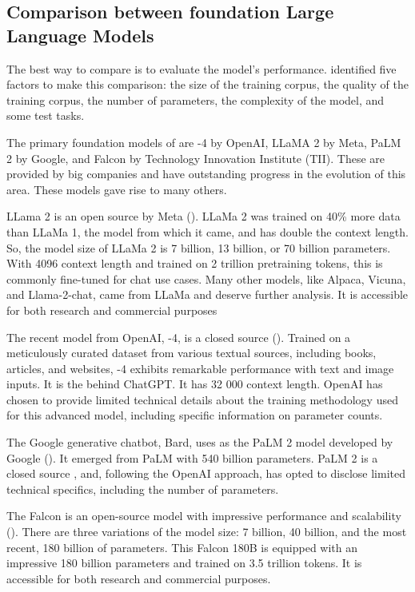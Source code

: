 \subsection{Comparison between foundation Large Language Models}

The best way to compare {\llm} is to evaluate the model's performance. \citet{hadi_LLM_2023} identified five factors to make this comparison: the size of the training corpus, the quality of the training corpus, the number of parameters, the complexity of the model, and some test tasks.

The primary foundation models of {\llm} are {\gpt}-4 by OpenAI, LLaMA 2 by Meta, PaLM 2 by Google, and Falcon by Technology Innovation Institute (TII). These {\llm} are provided by big companies and have outstanding progress in the evolution of this area. These models gave rise to many others.

LLama 2 is an open source {\llm} by Meta (\citet{touvron_llama_2023}). LLaMa 2 was trained on 40\% more data than LLaMa 1, the model from which it came, and has double the context length. So, the model size of LLaMa 2 is 7 billion, 13 billion, or 70 billion parameters. With 4096 context length and trained on 2 trillion pretraining tokens, this {\llm} is commonly fine-tuned for chat use cases. Many other models, like Alpaca, Vicuna, and Llama-2-chat, came from LLaMa and deserve further analysis. It is accessible for both research and commercial purposes

The recent {\gpt} model from OpenAI, {\gpt}-4, is a closed source {\llm} (\citet{openai_gpt-4_2023}). Trained on a meticulously curated dataset from various textual sources, including books, articles, and websites, {\gpt}-4 exhibits remarkable performance with text and image inputs. It is the {\llm} behind ChatGPT. It has 32 000 context length. OpenAI has chosen to provide limited technical details about the training methodology used for this advanced model, including specific information on parameter counts.

The Google generative chatbot, Bard, uses as {\llm} the PaLM 2 model developed by Google (\citet{anil_palm_2023}). It emerged from PaLM with 540 billion parameters. PaLM 2 is a closed source {\llm}, and, following the OpenAI approach, has opted to disclose limited technical specifics, including the number of parameters. 

The Falcon {\llm} is an open-source model with impressive performance and scalability (\citet{almazrouei_falcon_2023}). There are three variations of the model size: 7 billion, 40 billion, and the most recent, 180 billion of parameters. This Falcon 180B is equipped with an impressive 180 billion parameters and trained on 3.5 trillion tokens. It is accessible for both research and commercial purposes.

